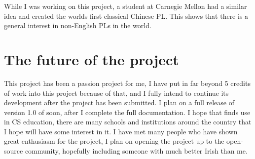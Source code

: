 While I was working on this project, a student at Carnegie Mellon had a similar idea and created the worlds first classical Chinese PL\cite{chinesepl}. This shows that there is a general interest in non-English PLs in the world.

\section{The future of the project}

This project has been a passion project for me, I have put in far beyond 5 credits of work into this project because of that, and I fully intend to continue its development after the project has been submitted. I plan on a full release of version 1.0 of \Setanta{} soon, after I complete the full documentation.
I hope that \Setanta{} finds use in CS education, there are many schools and institutions around the country that I hope will have some interest in it. I have met many people who have shown great enthusiasm for the project, I plan on opening the project up to the open-source community, hopefully including someone with much better Irish than me.
